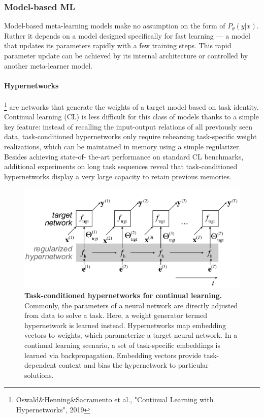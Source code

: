\documentclass[main]{subfiles}
\begin{document}
\subsubsection{Model-based ML}
Model-based meta-learning models make no assumption on the form of $P_{\theta}(y|x)$. Rather it depends on a model designed specifically for fast learning — a model that updates its parameters rapidly with a few training steps. This rapid parameter update can be achieved by its internal architecture or controlled by another meta-learner model.

\paragraph{Hypernetworks}\footnote{Oswald\&Henning\&Sacramento et al., "Continual Learning with Hypernetworks", 2019} are networks that generate
the weights of a target model based on task identity. Continual learning (CL) is less difficult for this class of models thanks to a simple key feature: instead of recalling the input-output relations of all previously seen data, task-conditioned hypernetworks only require rehearsing task-specific weight realizations, which can be maintained in memory using a simple regularizer. Besides achieving state-of-
the-art performance on standard CL benchmarks, additional experiments on long task sequences reveal that task-conditioned hypernetworks display a very large capacity to retain previous memories.
%
\begin{figure}[H]
    \centering
    \includegraphics[width=0.85\linewidth]{14_ContinualMetaAndTransferLearning/figures/hypernetwork.png}
    \caption{\textbf{Task-conditioned hypernetworks for continual learning.} Commonly, the parameters of a neural network are directly adjusted from data to solve a task. Here, a weight generator termed hypernetwork is learned instead. Hypernetworks map embedding vectors to weights, which parameterize a target neural network. In a continual learning scenario, a set of task-specific embeddings is learned via backpropagation. Embedding vectors provide task-dependent context and bias the hypernetwork to particular solutions.}
    \label{fig:my_label}
\end{figure}
\end{document}
